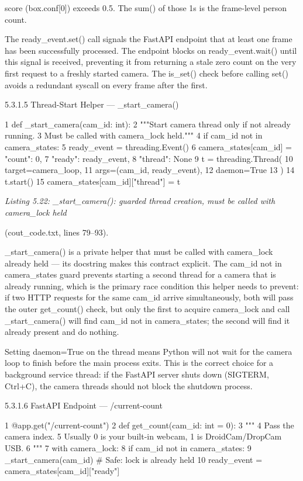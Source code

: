 score (box.conf[0]) exceeds 0.5. The sum() of those 1s is the frame-level person count.

The ready\_event.set() call signals the FastAPI endpoint that at least one frame
has been successfully processed. The endpoint blocks on ready\_event.wait() until this
signal is received, preventing it from returning a stale zero count on the very ﬁrst request
to a freshly started camera. The is\_set() check before calling set() avoids a redundant
syscall on every frame after the ﬁrst.


5.3.1.5 Thread-Start Helper --- \_start\_camera()

1 def \_start\_camera(cam\_id: int):
2 """Start camera thread only if not already running.
3 Must be called with camera\_lock held."""
4 if cam\_id not in camera\_states:
5 ready\_event = threading.Event()
6 camera\_states[cam\_id] = {"count": 0,
7 "ready": ready\_event,
8 "thread": None}
9 t = threading.Thread(
10 target=camera\_loop,
11 args=(cam\_id, ready\_event),
12 daemon=True
13 )
14 t.start()
15 camera\_states[cam\_id]["thread"] = t


\textit{Listing 5.22: \_start\_camera(): guarded thread creation, must be called with camera\_lock held}

(cout\_code.txt, lines 79--93).



\_start\_camera() is a private helper that must be called with camera\_lock already
held --- its docstring makes this contract explicit. The cam\_id not in camera\_states
guard prevents starting a second thread for a camera that is already running, which is
the primary race condition this helper needs to prevent: if two HTTP requests for the
same cam\_id arrive simultaneously, both will pass the outer get\_count() check, but only
the ﬁrst to acquire camera\_lock and call \_start\_camera() will ﬁnd cam\_id not in
camera\_states; the second will ﬁnd it already present and do nothing.

Setting daemon=True on the thread means Python will not wait for the camera loop
to ﬁnish before the main process exits. This is the correct choice for a background service
thread: if the FastAPI server shuts down (SIGTERM, Ctrl+C), the camera threads should
not block the shutdown process.



5.3.1.6 FastAPI Endpoint --- /current-count

1 @app.get("/current-count")
2 def get\_count(cam\_id: int = 0):
3 """
4 Pass the camera index.
5 Usually 0 is your built-in webcam, 1 is DroidCam/DropCam USB.
6 """
7 with camera\_lock:
8 if cam\_id not in camera\_states:
9 \_start\_camera(cam\_id) \# Safe: lock is already held
10 ready\_event = camera\_states[cam\_id]["ready"]


